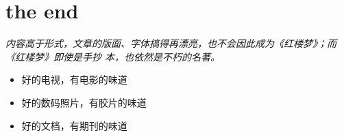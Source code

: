 ﻿\documentclass[hyperref={bookmarks=true},xcolor=pdflatex,svgnames,table,compress]{beamer}
\begin{document}
\section{the end}
\begin{frame}

  \begin{block}
    {\itshape
      内容高于形式，文章的版面、字体搞得再漂亮，也不会因此成为《红楼梦》；而《红楼梦》即使是手抄
      本，也依然是不朽的名著。
    }
  \end{block}

  {\itshape
    \begin{itemize}
    \item 好的电视，有电影的味道
    \item 好的数码照片，有胶片的味道
    \item 好的文档，有期刊的味道
    \end{itemize}
  }

\end{frame}
\end{document}

